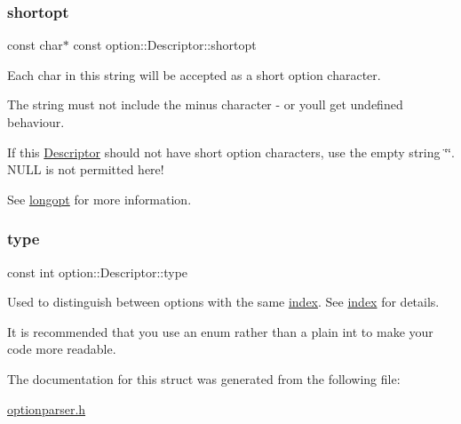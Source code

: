 \subsubsection{\texorpdfstring{shortopt}{shortopt}}
{\footnotesize\ttfamily const char$\ast$ const option\+::\+Descriptor\+::shortopt}



Each char in this string will be accepted as a short option character. 

The string must not include the minus character {\ttfamily \textquotesingle{}-\/\textquotesingle{}} or you\textquotesingle{}ll get undefined behaviour.

If this \hyperlink{structoption_1_1_descriptor}{Descriptor} should not have short option characters, use the empty string \char`\"{}\char`\"{}. N\+U\+LL is not permitted here!

See \hyperlink{structoption_1_1_descriptor_a470c449dfa894c9bfda2dae026142b4b}{longopt} for more information. \mbox{\label{structoption_1_1_descriptor_a1b220dabd8aad075fa441a80f9b9343c}} 
\subsubsection{\texorpdfstring{type}{type}}
{\footnotesize\ttfamily const int option\+::\+Descriptor\+::type}



Used to distinguish between options with the same \hyperlink{structoption_1_1_descriptor_a1fee8ac44f529c99ac2b1149b4c391b1}{index}. See \hyperlink{structoption_1_1_descriptor_a1fee8ac44f529c99ac2b1149b4c391b1}{index} for details. 

It is recommended that you use an enum rather than a plain int to make your code more readable. 

The documentation for this struct was generated from the following file\+:\begin{DoxyCompactItemize}
\item 
\hyperlink{optionparser_8h}{optionparser.\+h}\end{DoxyCompactItemize}
